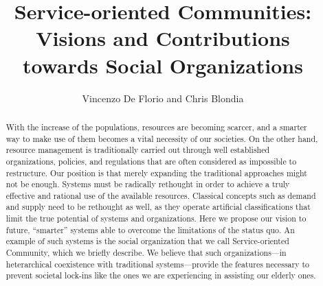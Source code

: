 \documentclass{llncs}
\begin{document}
\frontmatter          \pagestyle{headings}  

\mainmatter

\title{Service-oriented Communities:\\
Visions and Contributions\\
towards Social Organizations}

\author{Vincenzo De Florio and Chris Blondia}

\maketitle

\begin{abstract}


With the increase of the populations, resources are becoming scarcer, and a smarter way to make use of
them becomes a vital necessity of our societies. On the other hand, resource management is traditionally
carried out through well established organizations, policies, and regulations that are often considered
as impossible to restructure. Our position is that merely expanding the traditional
approaches might not be enough. Systems must be radically rethought in order to
achieve a truly effective and rational use of the available resources. Classical concepts such as demand
and supply need to be rethought as well, as they operate artificial classifications that limit the true
potential of systems and organizations. 
Here we propose our vision to future, ``smarter'' systems able to overcome the limitations 
of the status quo. 
An example of such systems is the social organization that we call Service-oriented Community,
which we briefly describe.
We believe that such organizations---in heterarchical coexistence with traditional systems---provide 
the features necessary to prevent societal lock-ins like the ones we are experiencing in
assisting our elderly ones.
\end{abstract}
\end{document}
